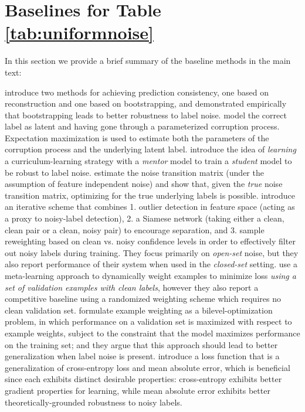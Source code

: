 \documentclass{article}
\renewcommand{\b}[1]{\textbf{#1}}
\begin{document}
\section{Baselines for Table \ref{tab:uniformnoise}}
\label{appendix:baselines}
In this section we provide a brief summary of the baseline methods in the main text:

\b{\cite{reed2014}} introduce two methods for achieving prediction consistency, one based on reconstruction and one based on bootstrapping, and demonstrated empirically that bootstrapping leads to better robustness to label noise.
\b{\cite{goldberger2016}} model the correct label as latent and having gone through a parameterized corruption process. Expectation maximization is used to estimate both the parameters of the corruption process and the underlying latent label.
\b{\cite{jiang2018}} introduce the idea of \emph{learning} a curriculum-learning strategy with a \emph{mentor} model to train a \emph{student} model to be robust to label noise.
\b{\cite{patrini2016}} estimate the noise transition matrix (under the assumption of feature independent noise) and show that, given the \emph{true} noise transition matrix, optimizing for the true underlying labels is possible.
\b{\cite{wang2018}} introduce an iterative scheme that combines 1. outlier detection in feature space (acting as a proxy to noisy-label detection), 2. a Siamese network (taking either a clean, clean pair or a clean, noisy pair) to encourage separation, and 3. sample reweighting based on clean vs. noisy confidence levels in order to effectively filter out noisy labels during training. They focus primarily on \emph{open-set} noise, but they also report performance of their system when used in the \emph{closed-set} setting.
\b{\cite{ren2018}} use a meta-learning approach to dynamically weight examples to minimize loss \emph{using a set of validation examples with clean labels}, however they also report a competitive baseline using a randomized weighting scheme which requires no clean validation set.
\b{\cite{jenni2018}} formulate example weighting as a bilevel-optimization problem, in which performance on a validation set is maximized with respect to example weights, subject to the constraint that the model maximizes performance on the training set; and they argue that this approach should lead to better generalization when label noise is present. 
\b{\cite{zhang2018}} introduce a loss function that is a generalization of cross-entropy loss and mean absolute error, which is beneficial since each exhibits distinct desirable properties: cross-entropy exhibits better gradient properties for learning, while mean absolute error exhibits better theoretically-grounded robustness to noisy labels. 
\end{document}
